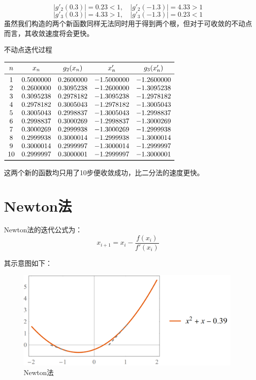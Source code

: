 \documentclass{ctexart}
\begin{document}
\[
|g'_2(0.3)| = 0.23 < 1,\quad |g'_2(-1.3)| = 4.33 > 1
\]
\[
|g'_3(0.3)| = 4.33 > 1,\quad |g'_3(-1.3)| = 0.23 < 1
\]
虽然我们构造的两个新函数同样无法同时用于得到两个根，但对于可收敛的不动点而言，其收敛速度将会更快。

\begin{table}[htpb]
\centering
\caption{不动点迭代过程}
$\begin{array}{ccccc}
    \toprule
n & x_n & g_2(x_n) & x'_n & g_3(x'_n) \\
\midrule
 1 & 0.5000000 & 0.2600000 & -1.5000000 & -1.2600000 \\
 2 & 0.2600000 & 0.3095238 & -1.2600000 & -1.3095238 \\
 3 & 0.3095238 & 0.2978182 & -1.3095238 & -1.2978182 \\
 4 & 0.2978182 & 0.3005043 & -1.2978182 & -1.3005043 \\
 5 & 0.3005043 & 0.2998837 & -1.3005043 & -1.2998837 \\
 6 & 0.2998837 & 0.3000269 & -1.2998837 & -1.3000269 \\
 7 & 0.3000269 & 0.2999938 & -1.3000269 & -1.2999938 \\
 8 & 0.2999938 & 0.3000014 & -1.2999938 & -1.3000014 \\
 9 & 0.3000014 & 0.2999997 & -1.3000014 & -1.2999997 \\
10 & 0.2999997 & 0.3000001 & -1.2999997 & -1.3000001 \\
    \bottomrule
\end{array}\label{table:fpi2}$
\end{table}

这两个新的函数均只用了10步便收敛成功，比二分法的速度更快。

\section{Newton法}
Newton法的迭代公式为：
\[
x_{i+1} = x_i - \frac{f(x_i)}{f'(x_i)}
\]

其示意图如下：

\begin{figure}[htbp]
  \centering
  \includegraphics[width=30em]{plot5.png}
  \caption{Newton法}
  \label{fig:plot4}
\end{figure}
\end{document}
